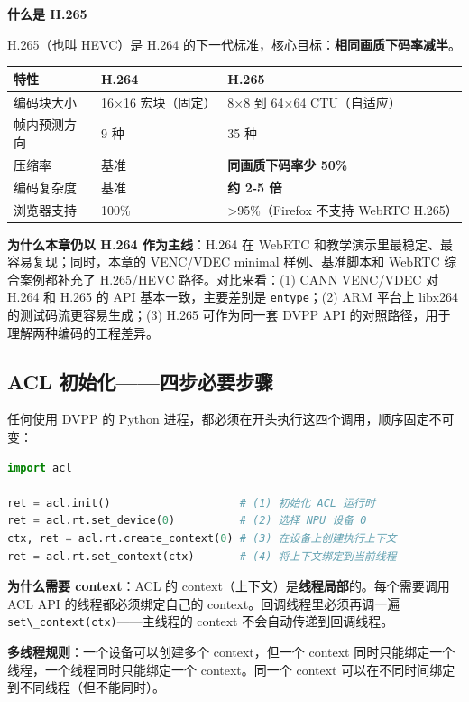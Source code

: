 \textbf{什么是 H.265}

H.265（也叫 HEVC）是 H.264
的下一代标准，核心目标：\textbf{相同画质下码率减半}。

\begin{longtable}[]{@{}lll@{}}
\toprule\noalign{}
特性 & H.264 & H.265 \\
\midrule\noalign{}
\endhead
\bottomrule\noalign{}
\endlastfoot
编码块大小 & 16×16 宏块（固定） & 8×8 到 64×64 CTU（自适应） \\
帧内预测方向 & 9 种 & 35 种 \\
压缩率 & 基准 & \textbf{同画质下码率少 50\%} \\
编码复杂度 & 基准 & \textbf{约 2-5 倍} \\
浏览器支持 & 100\% & \textgreater95\%（Firefox 不支持 WebRTC H.265） \\
\end{longtable}

\textbf{为什么本章仍以 H.264 作为主线}：H.264 在 WebRTC
和教学演示里最稳定、最容易复现；同时，本章的 VENC/VDEC minimal
样例、基准脚本和 WebRTC 综合案例都补充了 H.265/HEVC 路径。对比来看：(1)
CANN VENC/VDEC 对 H.264 和 H.265 的 API 基本一致，主要差别是
\passthrough{\lstinline!entype!}；(2) ARM 平台上 libx264
的测试码流更容易生成；(3) H.265 可作为同一套 DVPP API
的对照路径，用于理解两种编码的工程差异。

\subsection{ACL 初始化------四步必要步骤}\label{acl-init}

任何使用 DVPP 的 Python
进程，都必须在开头执行这四个调用，顺序固定不可变：

\begin{lstlisting}[language=Python]
import acl

ret = acl.init()                    # (1) 初始化 ACL 运行时
ret = acl.rt.set_device(0)          # (2) 选择 NPU 设备 0
ctx, ret = acl.rt.create_context(0) # (3) 在设备上创建执行上下文
ret = acl.rt.set_context(ctx)       # (4) 将上下文绑定到当前线程
\end{lstlisting}

\textbf{为什么需要 context}：ACL 的
context（上下文）是\textbf{线程局部}的。每个需要调用 ACL API
的线程都必须绑定自己的 context。回调线程里必须再调一遍
\passthrough{\lstinline!set\_context(ctx)!}------主线程的 context
不会自动传递到回调线程。

\textbf{多线程规则}：一个设备可以创建多个 context，但一个 context
同时只能绑定一个线程，一个线程同时只能绑定一个 context。同一个 context
可以在不同时间绑定到不同线程（但不能同时）。

